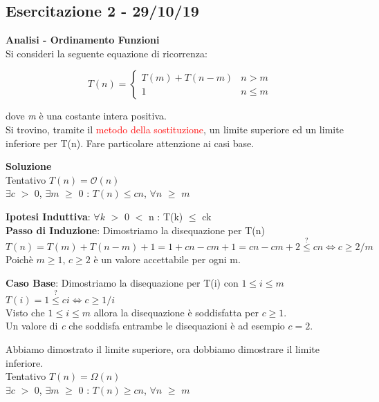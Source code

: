 \documentclass[../cheatSheetAlgoritmi.tex]{subfiles}
\begin{document}
\subsection{Esercitazione 2 - 29/10/19}
\textbf{Analisi - Ordinamento Funzioni}\\
Si consideri la seguente equazione di ricorrenza:
\begin{center}
	\begin{equation*}
  		T(n)=\begin{cases}
			T(m) +  T(n - m) & \text{$n > m$}\\
			1 & \text{$n \leq m$}	
  		\end{cases}
	\end{equation*}
\end{center}
dove \textit{m} è una costante intera positiva.\\
Si trovino, tramite il \textcolor{red}{metodo della sostituzione}, un limite superiore ed un limite inferiore per T(n). Fare particolare attenzione ai casi base.

\bigskip
\textbf{Soluzione}\\
Tentativo $T(n) = \mathcal{O}(n)$\\
$\exists c$ $>$ 0, $\exists m$ $\geq$ 0 : $T(n) \leq cn$, $\forall n$ $\geq$ $m$

\bigskip
\textbf{Ipotesi Induttiva}: $\forall k$ $>$ 0 $<$ n : T(k) $\leq$ ck\\
\textbf{Passo di Induzione}: Dimostriamo la disequazione per T(n)\\
$T(n) = T(m) + T(n-m) + 1 = 1 + cn - cm + 1 = cn - cm + 2 \stackrel{?}{\leq} cn \iff c \geq 2/m$\\
Poichè $m \geq 1$, $c \geq 2$ è un valore accettabile per ogni m.

\bigskip
\textbf{Caso Base}: Dimostriamo la disequazione per T(i) con $1 \leq i \leq m$\\
$T(i) = 1 \stackrel{?}{\leq} ci \iff c \geq 1/i$\\
Visto che $1 \leq i \leq m$ allora la disequazione è soddisfatta per $c \geq 1$.\\
Un valore di \textit{c} che soddisfa entrambe le disequazioni è ad esempio $c = 2$.

\bigskip
Abbiamo dimostrato il limite superiore, ora dobbiamo dimostrare il limite inferiore.\\
Tentativo $T(n) = \Omega(n)$\\
$\exists c$ $>$ 0, $\exists m$ $\geq$ 0 : $T(n) \geq cn$, $\forall n$ $\geq$ $m$
\end{document}
